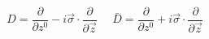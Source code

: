 \begin{equation}
D= \frac{\partial}{\partial z^{0}}-i \vec{\sigma} \cdot
\frac{\partial}{\partial \vec{z}}~~~~~~\bar{D}= \frac{\partial}{\partial z^{0}}+
i \vec{\sigma} \cdot \frac{\partial}{\partial \vec{z}}     \label{124}
\end{equation}

